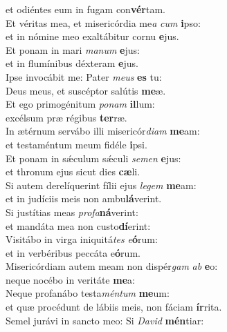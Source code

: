 \oddverse et odiéntes eum in fugam con\textbf{vér}tam.\\
\evenverse Et véritas mea, et misericórdia me\textit{a} \textit{cum} \textbf{i}pso:~\*\\
\evenverse et in nómine meo exaltábitur cornu \textbf{e}jus.\\
\oddverse Et ponam in mari \textit{ma}\textit{num} \textbf{e}jus:~\*\\
\oddverse et in flumínibus déxteram \textbf{e}jus.\\
\evenverse Ipse invocábit me: Pater \textit{me}\textit{us} \textbf{es} tu:~\*\\
\evenverse Deus meus, et suscéptor salútis \textbf{me}æ.\\
\oddverse Et ego primogénitum \textit{po}\textit{nam} \textbf{il}lum:~\*\\
\oddverse excélsum præ régibus \textbf{ter}ræ.\\
\evenverse In ætérnum servábo illi misericór\textit{di}\textit{am} \textbf{me}am:~\*\\
\evenverse et testaméntum meum fidéle \textbf{i}psi.\\
\oddverse Et ponam in sǽculum sǽculi \textit{se}\textit{men} \textbf{e}jus:~\*\\
\oddverse et thronum ejus sicut dies \textbf{cæ}li.\\
\evenverse Si autem derelíquerint fílii ejus \textit{le}\textit{gem} \textbf{me}am:~\*\\
\evenverse et in judíciis meis non ambu\textbf{lá}verint.\\
\oddverse Si justítias meas \textit{pro}\textit{fa}\textbf{ná}verint:~\*\\
\oddverse et mandáta mea non custo\textbf{dí}erint:\\
\evenverse Visitábo in virga iniquitá\textit{tes} \textit{e}\textbf{ó}rum:~\*\\
\evenverse et in verbéribus peccáta e\textbf{ó}rum.\\
\oddverse Misericórdiam autem meam non dispér\textit{gam} \textit{ab} \textbf{e}o:~\*\\
\oddverse neque nocébo in veritáte \textbf{me}a:\\
\evenverse Neque profanábo testa\textit{mén}\textit{tum} \textbf{me}um:~\*\\
\evenverse et quæ procédunt de lábiis meis, non fáciam \textbf{ír}rita.\\
\oddverse Semel jurávi in sancto meo: Si \textit{Da}\textit{vid} \textbf{mén}tiar:~\*\\
